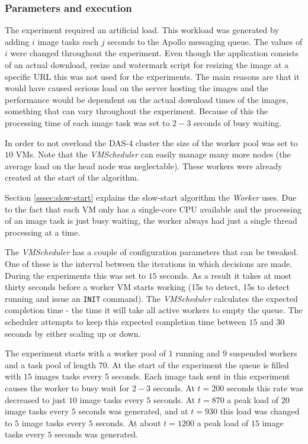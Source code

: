 \documentclass[10pt,journal,compsoc]{IEEEtran}
\begin{document}
\subsubsection{Parameters and execution}
\label{sssec:experiments-parameters}
The experiment required an artificial load. This workload was generated by
adding $i$ image tasks each $j$ seconds to the Apollo messaging queue. The values
of $i$ were changed throughout the experiment. Even though the application
consists of an actual download, resize and watermark script for resizing the
image at a specific URL this was not used for the experiments. The main reasons
are that it would have caused serious load on the server hosting the images and
the performance would be dependent on the actual download times of the images,
something that can vary throughout the experiment. Because of this the
processing time of each image task was set to $2-3$ seconds of busy waiting.

In order to not overload the DAS-4 cluster the size of the worker pool was set
to $10$ VMs. Note that the \emph{VMScheduler} can easily manage many more nodes
(the average load on the head node was neglectable). These workers were already
created at the start of the algorithm.

Section \ref{sssec:slow-start} explains the slow-start algorithm the
\emph{Worker} uses. Due to the fact that each VM only has a single-core CPU
available and the processing of an image task is just busy waiting, the worker
always had just a single thread processing at a time.

The \emph{VMScheduler} has a couple of configuration parameters that can be
tweaked. One of these is the interval between the iterations in which decisions
are made. During the experiments this was set to $15$ seconds. As a result it
takes at most thirty seconds before a worker VM starts working (15s to detect,
15s to detect running and issue an \texttt{INIT} command). The
\emph{VMScheduler} calculates the expected completion time - the time it will
take all active workers to empty the queue. The scheduler attempts to keep this
expected completion time between $15$ and $30$ seconds by either scaling up or
down.

The experiment starts with a worker pool of $1$ running and $9$ suspended
workers and a task pool of length $70$. At the start of the experiment the queue
is filled with $15$ images tasks every $5$ seconds. Each image task sent in this
experiment causes the worker to busy wait for $2-3$ seconds. At $t=200$ seconds
this rate was decreased to just $10$ image tasks every $5$ seconds. At $t=870$ a
peak load of $20$ image tasks  every $5$ seconds was generated, and at $t=930$
this load was changed to $5$ image tasks every $5$ seconds. At about $t=1200$ a
peak load of $15$ image tasks every $5$ seconds was generated.
\end{document}
